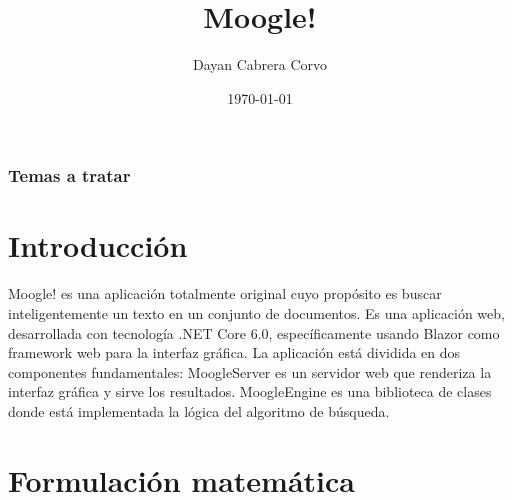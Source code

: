 \documentclass{beamer}
\title[Cabrera]{Moogle!}
\author[Dayan]{Dayan Cabrera Corvo}
\date{\today}
\begin{document}

\begin{frame}
	\frametitle{Temas a tratar} 
	\tableofcontents 
\end{frame}

\section{Introducci\'on}
\begin{frame}
\begin{minipage}{10cm}
	 Moogle! es una aplicación totalmente original cuyo propósito es buscar inteligentemente un texto en un conjunto de documentos. Es una aplicación web, desarrollada con tecnología .NET Core 6.0, específicamente usando Blazor como framework web para la interfaz gráfica. La aplicación está dividida en dos componentes fundamentales: MoogleServer es un servidor web que renderiza la interfaz gráfica y sirve los resultados. MoogleEngine es una biblioteca de clases donde está implementada la lógica del algoritmo de búsqueda. 
\end{minipage}
\end{frame}

\section{Formulaci\'on matem\'atica}
\end{document}
